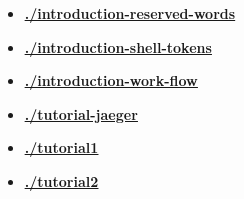 \documentclass[12pt]{article}
\begin{document}
\begin{itemize}
\item \href{.././introduction-reserved-words/./introduction-reserved-words.pdf}{\bf \underline{./introduction-reserved-words}}

\item \href{.././introduction-shell-tokens/./introduction-shell-tokens.pdf}{\bf \underline{./introduction-shell-tokens}}

\item \href{.././introduction-work-flow/./introduction-work-flow.pdf}{\bf \underline{./introduction-work-flow}}

\item \href{.././tutorial-jaeger/./tutorial-jaeger.pdf}{\bf \underline{./tutorial-jaeger}}

\item \href{.././tutorial1/./tutorial1.pdf}{\bf \underline{./tutorial1}}

\item \href{.././tutorial2/./tutorial2.pdf}{\bf \underline{./tutorial2}}


\end{itemize}

\end{document}
